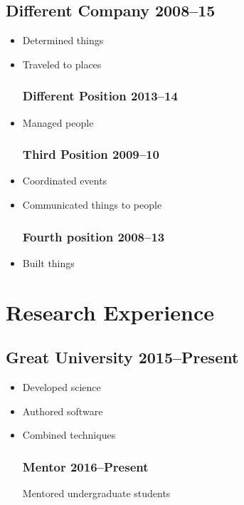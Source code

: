\documentclass[11pt]{article}
\begin{document}
\subsection*{Different Company \hfill 2008--15}
\begin{itemize}
\subsubsection*{Position \hfill 2014--15}
\item Determined things
\item Traveled to places

\subsubsection*{Different Position \hfill 2013--14}
\item Managed people

\subsubsection*{Third Position \hfill 2009--10}
\item Coordinated events
\item Communicated things to people

\subsubsection*{Fourth position \hfill 2008--13}
\item Built things
\end{itemize}


\section*{Research Experience}
\subsection*{Great University \hfill 2015--Present}
\begin{itemize}
\subsubsection*{Researcher in Dr. Awesome Man's Research Group
\hfill 2015--Present}
\item Developed science
\item Authored software
\item Combined techniques
\subsubsection*{Mentor \hfill 2016--Present}
Mentored undergraduate students 
\end{itemize}
\end{document}
